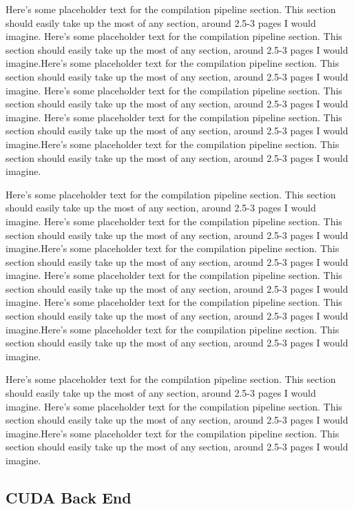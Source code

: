 \documentclass[preprint]{sigplanconf}
\begin{document}
Here's some placeholder text for the compilation pipeline section.  This
section should easily take up the most of any section, around 2.5-3 pages I
would imagine.
Here's some placeholder text for the compilation pipeline section.  This
section should easily take up the most of any section, around 2.5-3 pages I
would imagine.Here's some placeholder text for the compilation pipeline section.
 This
section should easily take up the most of any section, around 2.5-3 pages I
would imagine.
Here's some placeholder text for the compilation pipeline section.  This
section should easily take up the most of any section, around 2.5-3 pages I
would imagine.
Here's some placeholder text for the compilation pipeline section.  This
section should easily take up the most of any section, around 2.5-3 pages I
would imagine.Here's some placeholder text for the compilation pipeline section.
 This
section should easily take up the most of any section, around 2.5-3 pages I
would imagine.

Here's some placeholder text for the compilation pipeline section.  This
section should easily take up the most of any section, around 2.5-3 pages I
would imagine.
Here's some placeholder text for the compilation pipeline section.  This
section should easily take up the most of any section, around 2.5-3 pages I
would imagine.Here's some placeholder text for the compilation pipeline section.
 This
section should easily take up the most of any section, around 2.5-3 pages I
would imagine.
Here's some placeholder text for the compilation pipeline section.  This
section should easily take up the most of any section, around 2.5-3 pages I
would imagine.
Here's some placeholder text for the compilation pipeline section.  This
section should easily take up the most of any section, around 2.5-3 pages I
would imagine.Here's some placeholder text for the compilation pipeline section.
 This
section should easily take up the most of any section, around 2.5-3 pages I
would imagine.

Here's some placeholder text for the compilation pipeline section.  This
section should easily take up the most of any section, around 2.5-3 pages I
would imagine.
Here's some placeholder text for the compilation pipeline section.  This
section should easily take up the most of any section, around 2.5-3 pages I
would imagine.Here's some placeholder text for the compilation pipeline section.
 This
section should easily take up the most of any section, around 2.5-3 pages I
would imagine.

\subsection{CUDA Back End}
\end{document}
